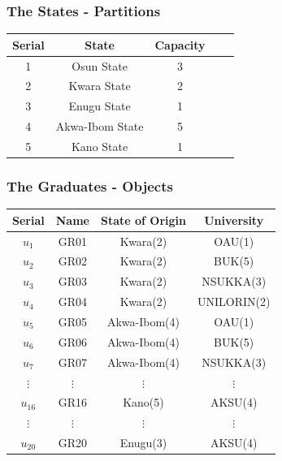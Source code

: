 \documentclass[10pt]{beamer}
\begin{document}
			\begin{frame}
				\frametitle{The States - Partitions}
				\begin{center}
					\begin{tabular}{|c|c|c|c|c|}
						\hline
						\textbf{Serial} & \textbf{State} & \textbf{Capacity} \\
						\hline
						1 & Osun State & 3\\
						\hline
						2 & Kwara State & 2\\
						\hline
						3 & Enugu State & 1\\
						\hline
						4 & Akwa-Ibom State & 5\\
						\hline
						5 & Kano State & 1\\
						\hline
					\end{tabular}		
				\end{center}
			\end{frame}
			\begin{frame}
				\frametitle{The Graduates - Objects}				
				\begin{center}
					\begin{tabular}{|c|c|c|c|}
						\hline
						\textbf{Serial} & \textbf{Name} & \textbf{State of Origin} & \textbf{University}\\
						\hline
						$u_{1}$ & GR01 & Kwara(2) & OAU(1)\\
						\hline
						$u_{2}$ & GR02 & Kwara(2) & BUK(5)\\
						\hline
						$u_{3}$ & GR03 & Kwara(2) & NSUKKA(3)\\
						\hline
						$u_{4}$ & GR04 & Kwara(2) & UNILORIN(2)\\
						\hline
						$u_{5}$ & GR05 & Akwa-Ibom(4) & OAU(1)\\
						\hline
						$u_{6}$ & GR06 & Akwa-Ibom(4) & BUK(5)\\
						\hline
						$u_{7}$ & GR07 & Akwa-Ibom(4) & NSUKKA(3)\\
						\hline
						$\vdots $ & $\vdots $ & $\vdots $ & $\vdots $ \\
						\hline
						$u_{16}$ & GR16 & Kano(5) & AKSU(4)\\
						\hline
						$\vdots $ & $\vdots $ & $\vdots $ & $\vdots $ \\
						\hline
						$u_{20}$ & GR20 & Enugu(3) & AKSU(4)\\
						\hline
					\end{tabular}		
				\end{center}
			\end{frame}
\end{document}
